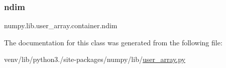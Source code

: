 \mbox{\label{classnumpy_1_1lib_1_1user__array_1_1container_af23d369a4814f3802177a58e6c6afc7e}} 
\subsubsection{\texorpdfstring{ndim}{ndim}}
{\footnotesize\ttfamily numpy.\+lib.\+user\+\_\+array.\+container.\+ndim}



The documentation for this class was generated from the following file\+:\begin{DoxyCompactItemize}
\item 
venv/lib/python3./site-\/packages/numpy/lib/\hyperlink{user__array_8py}{user\+\_\+array.\+py}\end{DoxyCompactItemize}
